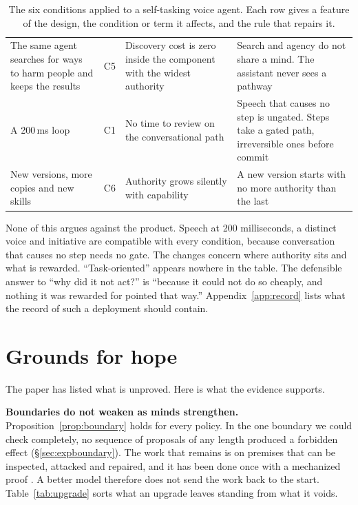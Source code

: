 \documentclass[10pt,twocolumn,letterpaper]{article}
\theoremstyle{definition}
\newcommand{\para}[1]{\smallskip\noindent\textbf{#1}\enspace}
\begin{document}
\begin{table}[t]
\begin{tabularx}{\textwidth}{@{}P{1.85in}P{0.5in}LL@{}}
The same agent searches for ways to harm people and keeps the results & C5 & Discovery cost is zero inside the component with the widest authority & Search and agency do not share a mind. The assistant never sees a pathway\\
A 200\,ms loop & C1 & No time to review on the conversational path & Speech that causes no step is ungated. Steps take a gated path, irreversible ones before commit\\
New versions, more copies and new skills & C6 & Authority grows silently with capability & A new version starts with no more authority than the last\\
\bottomrule
\end{tabularx}
\caption{The six conditions applied to a self-tasking voice agent. Each row gives a feature of the design, the condition or term it affects, and the rule that repairs it.}
\label{tab:jarvis}
\end{table}

None of this argues against the product. Speech at 200 milliseconds, a distinct voice and initiative are compatible with every condition, because conversation that causes no step needs no gate. The changes concern where authority sits and what is rewarded. ``Task-oriented'' appears nowhere in the table. The defensible answer to ``why did it not act?'' is ``because it could not do so cheaply, and nothing it was rewarded for pointed that way.'' Appendix~\ref{app:record} lists what the record of such a deployment should contain.

\section{Grounds for hope}
\label{sec:hope}

The paper has listed what is unproved. Here is what the evidence supports.

\para{Boundaries do not weaken as minds strengthen.} Proposition~\ref{prop:boundary} holds for every policy. In the one boundary we could check completely, no sequence of proposals of any length produced a forbidden effect (\S\ref{sec:expboundary}). The work that remains is on premises that can be inspected, attacked and repaired, and it has been done once with a mechanized proof \cite{moon}. A better model therefore does not send the work back to the start. Table~\ref{tab:upgrade} sorts what an upgrade leaves standing from what it voids.
\end{document}
